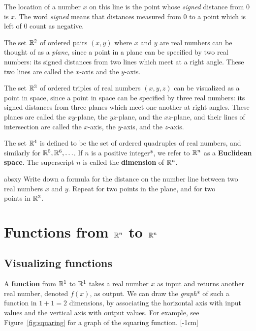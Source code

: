 \documentclass[svgnames]{watsonbook}
\begin{document}
The location of a number $x$ on this line is the point whose
\textit{signed} distance from 0 is $x$. The word \textit{signed} means
that distances measured from 0 to a point which is left of 0 count as
negative.

The set $\mathbb{R}^2$ of ordered pairs $(x,y)$ where $x$ and $y$ are real
numbers can be thought of as a \textit{plane}, since a point in a
plane can be specified by two real numbers: its signed distances from
two lines which meet at a right angle. These two lines are called the
$x$-axis and the $y$-axis.

The set $\mathbb{R}^3$ of ordered triples of real numbers $(x,y,z)$ can be
visualized as a point in space, since a point in space can be
specified by three real numbers: its signed distances from three
planes which meet one another at right angles. These planes are called
the $xy$-plane, the $yz$-plane, and the $xz$-plane, and their lines of
intersection are called the $x$-axis, the $y$-axis, and the $z$-axis. 

The set $\mathbb{R}^4$ is defined to be the set of ordered quadruples of real
numbers, and similarly for $\mathbb{R}^5, \mathbb{R}^6, \ldots$.  
 If
$n$ is a positive integer*, we refer to $\mathbb{R}^n$ as a \textbf{Euclidean
  space}. The superscript $n$
is called the \textbf{dimension} of $\mathbb{R}^n$. 

\begin{exercise}{}{absxy}
  Write down a formula for the distance on the number line between two \\
  real numbers $x$ and $y$. Repeat for two points in the plane, and
  for two \\ points in $\mathbb{R}^3$. 
\end{exercise}

\section{Functions from $\mathbb{R}^n$ to $\mathbb{R}^n$} \label{sec:RntoRn}

\subsection{Visualizing functions}

A \textbf{function} from $\mathbb{R}^1$ to $\mathbb{R}^1$ takes a real number $x$ as
input and returns another real number, denoted $f(x)$, as output. We
can draw the \textit{graph}* of such a function in $1 + 1 = 2$
dimensions, by associating the horizontal axis with input values and
the vertical axis with output values. For example, see
Figure~\ref{fig:squaring} for a graph of the squaring
function. [-1cm]
\end{document}
